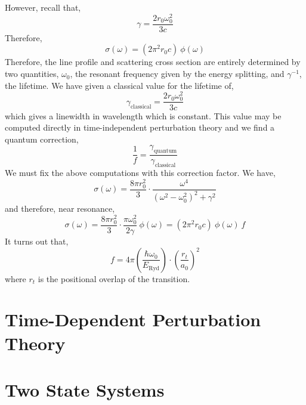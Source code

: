 \documentclass[12pt]{extarticle}
\theoremstyle{definition}
\begin{document}
However, recall that, 
\[ \gamma = \frac{2 r_0 \omega_0^2}{3 c} \]
Therefore,
\[ \sigma(\omega) = (2 \pi^2 r_0 c) \: \phi(\omega) \]
Therefore, the line profile and scattering cross section are entirely determined by two quantities, $\omega_0$, the resonant frequency given by the energy splitting, and $\gamma^{-1}$, the lifetime. We have given a classical value for the lifetime of,
\[ \gamma_{\text{classical}} = \frac{2 r_0 \omega_0^2}{3 c} \]
which gives a linewidth in wavelength which is constant. This value may be computed directly in time-independent perturbation theory and we find a quantum correction,
\[ \frac{1}{f} = \frac{\gamma_{\text{quantum}}}{\gamma_{\text{classical}}} \]
We must fix the above computations with this correction factor. We have,
\[ \sigma(\omega) = \frac{8 \pi r_0^2}{3} \cdot \frac{\omega^4}{(\omega^2 - \omega_0^2)^2 + \gamma^2} \]
and therefore, near resonance,
\[ \sigma(\omega) = \frac{8 \pi r_0^2}{3} \cdot \frac{\pi \omega_0^2}{2 \gamma} \: \phi(\omega) = (2 \pi^2 r_0 c) \: \phi(\omega) \: f \]
It turns out that,
\[ f = 4 \pi \left( \frac{\hbar \omega_0}{E_{\text{Ryd}}} \right)  \cdot \left( \frac{r_t}{a_0} \right)^2 \]
where $r_t$ is the positional overlap of the transition. 

\section{Time-Dependent Perturbation Theory}

\section{Two State Systems}

\newcommand{\Tr}[1]{\mathrm{Tr}\left( #1 \right)}
\end{document}
